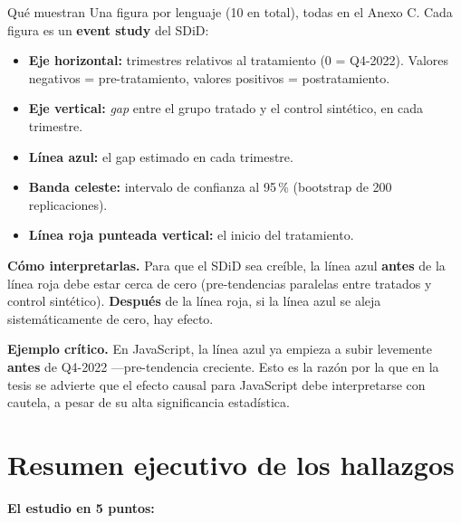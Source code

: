 \documentclass[11pt,a4paper]{article}
\begin{document}
\begin{lectura}{Qué muestran}
Una figura por lenguaje (10 en total), todas en el Anexo C. Cada figura es un \textbf{event study} del SDiD:
\begin{itemize}[leftmargin=*]
  \item \textbf{Eje horizontal:} trimestres relativos al tratamiento (0 = Q4-2022). Valores negativos = pre-tratamiento, valores positivos = postratamiento.
  \item \textbf{Eje vertical:} \textit{gap} entre el grupo tratado y el control sintético, en cada trimestre.
  \item \textbf{Línea azul:} el gap estimado en cada trimestre.
  \item \textbf{Banda celeste:} intervalo de confianza al 95\,\% (bootstrap de 200 replicaciones).
  \item \textbf{Línea roja punteada vertical:} el inicio del tratamiento.
\end{itemize}
\end{lectura}

\textbf{Cómo interpretarlas.} Para que el SDiD sea creíble, la línea azul \textbf{antes} de la línea roja debe estar cerca de cero (pre-tendencias paralelas entre tratados y control sintético). \textbf{Después} de la línea roja, si la línea azul se aleja sistemáticamente de cero, hay efecto.

\textbf{Ejemplo crítico.} En JavaScript, la línea azul ya empieza a subir levemente \textbf{antes} de Q4-2022 —pre-tendencia creciente. Esto es la razón por la que en la tesis se advierte que el efecto causal para JavaScript debe interpretarse con cautela, a pesar de su alta significancia estadística.

\section{Resumen ejecutivo de los hallazgos}

\textbf{El estudio en 5 puntos:}
\end{document}

